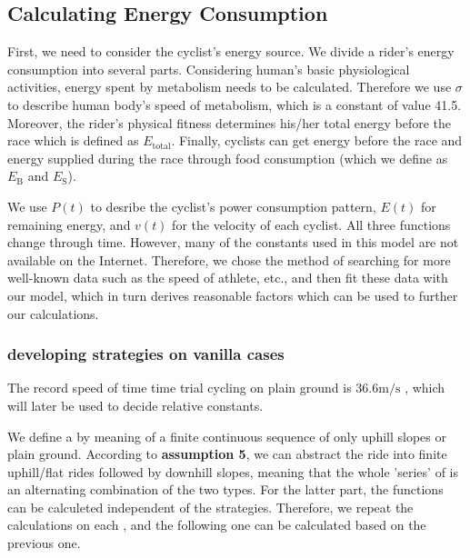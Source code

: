 \documentclass{article}
\begin{document}
		\subsection{Calculating Energy Consumption}
			First, we need to consider the cyclist's energy source. We divide a rider's energy consumption into several parts. Considering human's basic physiological activities, energy spent by metabolism needs to be calculated. Therefore we use $\sigma$ to describe human body's speed of metabolism, which is a constant of value 41.5. Moreover, the rider's physical fitness determines his/her total energy before the race which is defined as $ E _\mathrm{total}$. Finally, cyclists can get energy before the race and energy supplied during the race through food consumption (which we define as $ E _\mathrm{B}$ and $ E _\mathrm{S}$).

			We use $P(t)$ to desribe the cyclist's power consumption pattern, $E(t)$ for remaining energy, and $v(t)$ for the velocity of each cyclist. All three functions change through time. However, many of the constants used in this model are not available on the Internet. Therefore, we chose the method of searching for more well-known data such as the speed of athlete, etc., and then fit these data with our model, which in turn derives reasonable factors which can be used to further our calculations.

			\subsubsection{developing strategies on vanilla cases}
			The record speed of time time trial cycling on plain ground is 36.6$\mathrm{m/s}$ \cite{time trial record}, which will later be used to decide relative constants.

			We define a  by meaning of a finite continuous sequence of only uphill slopes or plain ground. According to \textbf{assumption 5}, we can abstract the ride into finite uphill/flat rides followed by downhill slopes, meaning that the whole 'series' of  is an alternating combination of the two types. For the latter part, the functions can be calculeted independent of the strategies. Therefore, we repeat the calculations on each , and the following one can be calculated based on the previous one.
\end{document}
